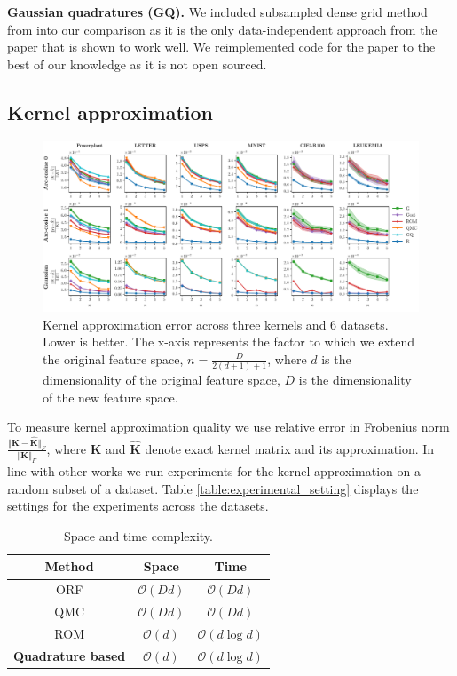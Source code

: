 \textbf{Gaussian quadratures (GQ).}
We included subsampled dense grid method from \citep{dao2017gaussian} into our comparison as
it is the only data-independent approach from the paper that is shown to work well.
We reimplemented code for the paper to the best of our knowledge as it is not open sourced.

\subsection{Kernel approximation}
\label{sub:kernelapprox}

\begin{figure}[t]
\centering
\includegraphics[width=\textwidth]{figures/quadratures/kernel_acc}
\caption{Kernel approximation error across three kernels and 6 datasets. Lower is better. The x-axis represents the factor to which we extend the original feature space, $n = \frac{D}{2(d+1)+1}$, where $d$ is the dimensionality of the original feature space, $D$ is the dimensionality of the new feature space.}
\label{fig:KA}
\end{figure}
To measure kernel approximation quality we use relative error in Frobenius norm
$\frac{\Vert \mathbf{K} - \mathbf{\hat{K}}\Vert_{F}}{\Vert \mathbf{K} \Vert_{F}}$,
where $\mathbf{K}$ and $\mathbf{\hat{K}}$ denote exact kernel matrix and its approximation.
In line with other works we run experiments for the kernel approximation on a random
subset of a dataset.
Table \ref{table:experimental_setting} displays the settings for the experiments across the
datasets.
\begin{table}[h]
    \centering
    \caption{Space and time complexity.}
    \label{table:complexity}
    \begin{tabular}{ c  c  c }
    \textbf{Method} & \textbf{Space} & \textbf{Time} \\
    \hline
    ORF & $\mathcal{O}(Dd)$ & $\mathcal{O}(Dd)$ \\
    QMC & $\mathcal{O}(Dd)$ & $\mathcal{O}(Dd)$ \\
    ROM & $\mathcal{O}(d)$ & $\mathcal{O}(d\log d)$ \\
    \textbf{Quadrature based} & $\mathcal{O}(d)$ & $\mathcal{O}(d\log d)$ \\
    \hline
    \end{tabular}
\end{table}
